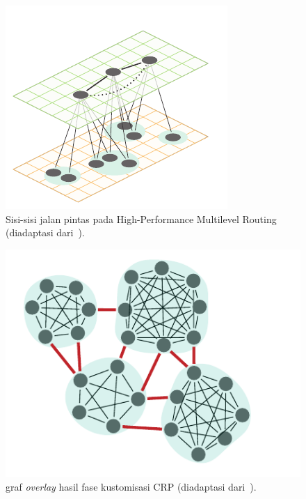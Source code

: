 \begin{figure}[H]
    \centering
    \includegraphics[]{figures/HPML.png}
    \caption{Sisi-sisi jalan pintas pada High-Performance Multilevel Routing (diadaptasi dari~\cite{Bast2015}).}
    \label{fig:hpml}
\end{figure}


\begin{figure}[H]
    \centering
    \includegraphics[]{figures/CRP.png}
    \caption{graf \textit{overlay} hasil fase kustomisasi CRP (diadaptasi dari~\cite{Bast2015}).}
    \label{fig:crp-overlay}
\end{figure}

